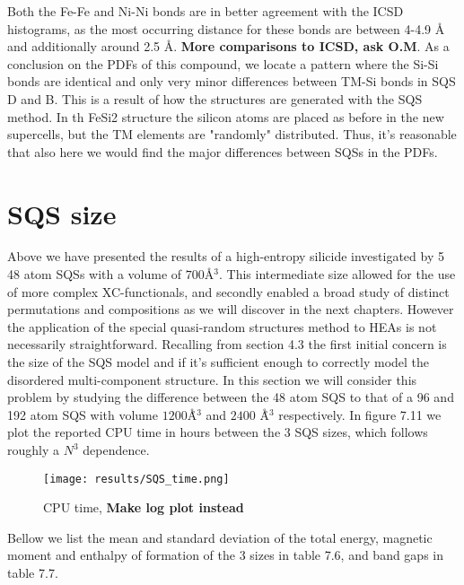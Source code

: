 Both the Fe-Fe and Ni-Ni bonds are in better agreement with the ICSD histograms, as the most occurring distance for these bonds are between 4-4.9 Å and additionally around 2.5 Å. \textbf{More comparisons to ICSD, ask O.M}. As a conclusion on the PDFs of this compound, we locate a pattern where the Si-Si bonds are identical and only very minor differences between TM-Si bonds in SQS D and B. This is a result of how the structures are generated with the SQS method. In th FeSi2 structure the silicon atoms are placed as before in the new supercells, but the TM elements are "randomly" distributed. Thus, it's reasonable that also here we would find the major differences between SQSs in the PDFs. 

\newpage
\section{SQS size}
Above we have presented the results of a high-entropy silicide  investigated by 5 48 atom SQSs with a volume of $700$\r{A}$^3$. This intermediate size allowed for the use of more complex XC-functionals, and secondly enabled a broad study of distinct permutations and compositions as we will discover in the next chapters. However the application of the special quasi-random structures method to HEAs is not necessarily straightforward. Recalling from section 4.3 the first initial concern is the size of the SQS model and if it's sufficient enough to correctly model the disordered multi-component structure. In this section we will consider this problem by studying the difference between the 48 atom SQS to that of a 96 and 192 atom SQS with volume $1200$\r{Å}$^3$ and $2400$ \r{Å}$^3$ respectively. In figure 7.11 we plot the reported CPU time in hours between the 3 SQS sizes, which follows roughly a $N^3$ dependence. 

\begin{figure}[H]
\centering
\texttt{[image: results/SQS\_time.png]}
\caption{CPU time, \textbf{Make log plot instead}}
\end{figure}

Bellow we list the mean and standard deviation of the total energy, magnetic moment and enthalpy of formation of the 3 sizes in table 7.6, and band gaps in table 7.7. 

